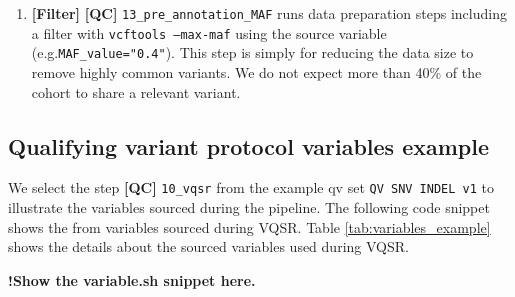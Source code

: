 \begin{enumerate}
\item \textbf{[Filter]} \textbf{[QC]} \colorbox{kispiblue!30}{\texttt{13\_pre\_annotation\_MAF}} runs data preparation steps including a filter with \texttt{vcftools --max-maf} using the source variable (e.g.\texttt{MAF\_value="0.4"}). This step is simply for reducing the data size to remove highly common variants. We do not expect more than 40\% of the cohort to share a relevant variant.
\end{enumerate}

\subsection{Qualifying variant protocol variables example}\label{sec:protocol_variables_example}

We select the step \textbf{[QC]} \colorbox{kispiblue!30}{\texttt{10\_vqsr}} from the example \ac{qv} set
\colorbox{colorSUNSET2!60}{\texttt{QV SNV INDEL v1}}
to illustrate the variables sourced during the pipeline.
The following code snippet shows the from variables sourced during VQSR. 
Table \ref{tab:variables_example} shows the details about the sourced variables used during VQSR.

\textbf{!Show the variable.sh snippet here.}

